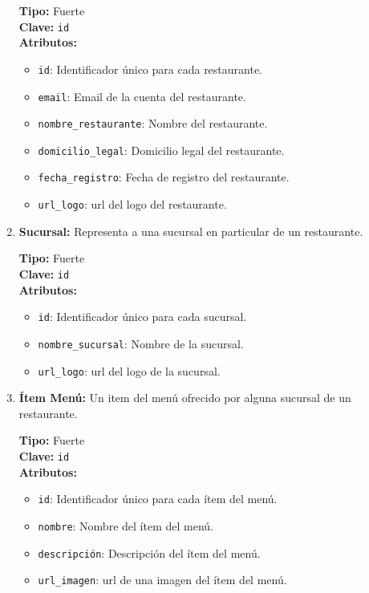 \begin{enumerate}
    \textbf{Tipo:} Fuerte \\
    \textbf{Clave:} \texttt{id} \\
    \textbf{Atributos:}
    \begin{itemize}
        \item \texttt{id}: Identificador único para cada restaurante.
        \item \texttt{email}: Email de la cuenta del restaurante.
        \item \texttt{nombre\_restaurante}: Nombre del restaurante.
        \item \texttt{domicilio\_legal}: Domicilio legal del restaurante.
        \item \texttt{fecha\_registro}: Fecha de registro del restaurante.
        \item \texttt{url\_logo}: url del logo del restaurante.
    \end{itemize}
    
    \item \textbf{Sucursal:} Representa a una sucursal en particular de un restaurante.
    
    \textbf{Tipo:} Fuerte \\
    \textbf{Clave:} \texttt{id} \\
    \textbf{Atributos:}
    \begin{itemize}
        \item \texttt{id}: Identificador único para cada sucursal.
        \item \texttt{nombre\_sucursal}: Nombre de la sucursal.
        \item \texttt{url\_logo}: url del logo de la sucursal.
    \end{itemize}
    
    \item \textbf{Ítem Menú:} Un item del menú ofrecido por alguna sucursal de un restaurante.
    
    \textbf{Tipo:} Fuerte \\
    \textbf{Clave:} \texttt{id} \\
    \textbf{Atributos:}
    \begin{itemize}
        \item \texttt{id}: Identificador único para cada ítem del menú.
        \item \texttt{nombre}: Nombre del ítem del menú.
        \item \texttt{descripción}: Descripción del ítem del menú.
        \item \texttt{url\_imagen}: url de una imagen del ítem del menú.
    \end{itemize}


\end{enumerate}
